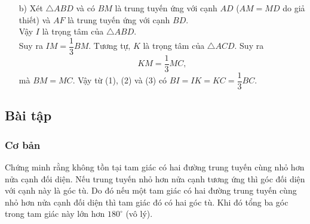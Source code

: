 \begin{vd}
{{
			}
			\begin{enumerate}
				\item[b)] Xét $\triangle ABD$ và có $BM$ là trung tuyến ứng với cạnh $AD$ ($AM=MD$ do giả thiết) và $AF$ là trung tuyến ứng với cạnh $BD$.\\
				Vậy $I$ là trọng tâm của $\triangle ABD$.\\
				Suy ra $IM = \dfrac{1}{3} BM$. 
				Tương tự, $K$ là trọng tâm của $\triangle ACD$. Suy ra
				\[KM = \dfrac{1}{3}MC, \tag{2}\]
				mà $BM = MC$. 
				Vậy từ (1), (2) và (3) có $BI = IK = KC = \dfrac{1}{3} BC$.
			\end{enumerate}
		}
	\end{vd}

\subsection{Bài tập}
\setcounter{bt}{0}
\subsubsection{Cơ bản}
\begin{bt}%
	Chứng minh rằng không tồn tại tam giác có hai đường trung tuyến cùng nhỏ hơn nửa cạnh đối diện.
	\loigiai
	{
		Nếu trung tuyến nhỏ hơn nửa cạnh tương ứng thì góc đối diện với cạnh này là góc tù. Do đó nếu một tam giác có hai đường trung tuyến cùng nhỏ hơn nửa cạnh đối diện thì tam giác đó có hai góc tù. Khi đó tổng ba góc trong tam giác này lớn hơn $180^\circ$ (vô lý).
	}
\end{bt}

